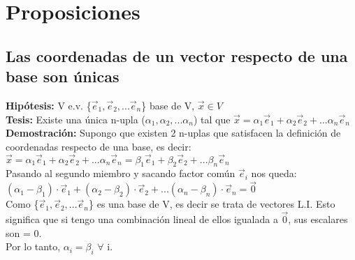 \documentclass[11pt]{article}
\begin{document}
\section{Proposiciones}
\subsection{Las coordenadas de un vector respecto de una base 
son únicas}
{\bfseries {Hipótesis:}} V e.v. \{$\vec{e}_{1}, \vec{e}_2,... \vec{e}_n $\} base de V, $\vec{x} \in V$ \\
{\bfseries {Tesis:}} Existe una única n-upla ($\alpha_{1}, \alpha_{2},... \alpha_{n}$) tal que $\vec{x} = \alpha_{1}\vec{e}_{1} + \alpha_{2}\vec{e}_{2} +... \alpha_{n}\vec{e}_{n}$\\
{\bfseries Demostración:} Supongo que existen 2 n-uplas que satisfacen la definición de coordenadas respecto de una base, es decir:\\
$\vec{x} = \alpha_{1}\vec{e}_{1} + \alpha_{2}\vec{e}_{2} +... \alpha_{n}\vec{e}_{n} = \beta_{1}\vec{e}_{1} + \beta_{2}\vec{e}_{2} +... \beta_{n}\vec{e}_{n}$\\
Pasando al segundo miembro y sacando factor común $\vec{e}_i$ nos queda: \\
$(\alpha_{1} - \beta_{1})\cdot\vec{e}_{1} + (\alpha_{2} - \beta_{2})\cdot\vec{e}_{2} +... (\alpha_{n} -\beta_{n})\cdot\vec{e}_{n} = \vec{0}$\\
Como \{$\vec{e}_{1}, \vec{e}_2,... \vec{e}_n $\} es una base de V, es decir se trata de vectores L.I. Esto significa que si tengo una combinación lineal de ellos igualada a $\vec{0}$, sus escalares son = 0. \\
Por lo tanto, $\alpha_{i} = \beta_{i}$ $\forall$ i.
\end{document}
